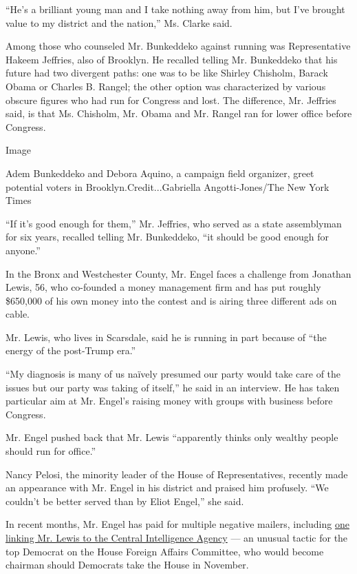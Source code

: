 ``He's a brilliant young man and I take nothing away from him, but I've
brought value to my district and the nation,'' Ms. Clarke said.

Among those who counseled Mr. Bunkeddeko against running was
Representative Hakeem Jeffries, also of Brooklyn. He recalled telling
Mr. Bunkeddeko that his future had two divergent paths: one was to be
like Shirley Chisholm, Barack Obama or Charles B. Rangel; the other
option was characterized by various obscure figures who had run for
Congress and lost. The difference, Mr. Jeffries said, is that Ms.
Chisholm, Mr. Obama and Mr. Rangel ran for lower office before Congress.

Image

Adem Bunkeddeko and Debora Aquino, a campaign field organizer, greet
potential voters in Brooklyn.Credit...Gabriella Angotti-Jones/The New
York Times

``If it's good enough for them,'' Mr. Jeffries, who served as a state
assemblyman for six years, recalled telling Mr. Bunkeddeko, ``it should
be good enough for anyone.''

In the Bronx and Westchester County, Mr. Engel faces a challenge from
Jonathan Lewis, 56, who co-founded a money management firm and has put
roughly \$650,000 of his own money into the contest and is airing three
different ads on cable.

Mr. Lewis, who lives in Scarsdale, said he is running in part because of
``the energy of the post-Trump era.''

``My diagnosis is many of us naïvely presumed our party would take care
of the issues but our party was taking of itself,'' he said in an
interview. He has taken particular aim at Mr. Engel's raising money with
groups with business before Congress.

Mr. Engel pushed back that Mr. Lewis ``apparently thinks only wealthy
people should run for office.''

Nancy Pelosi, the minority leader of the House of Representatives,
recently made an appearance with Mr. Engel in his district and praised
him profusely. ``We couldn't be better served than by Eliot Engel,'' she
said.

In recent months, Mr. Engel has paid for multiple negative mailers,
including
\href{https://int.nyt.com/data/documenthelper/52-engel-cia-mailer/56e35fd9f054abe789be/optimized/full.pdf\#page=1}{one
linking Mr. Lewis to the Central Intelligence Agency} --- an unusual
tactic for the top Democrat on the House Foreign Affairs Committee, who
would become chairman should Democrats take the House in November.

